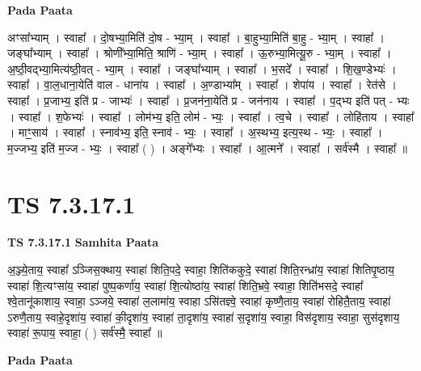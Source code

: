 \documentclass[17pt]{extarticle}
\begin{document}
\textbf{Pada Paata} \newline

अꣳसा᳚भ्याम् । स्वाहा᳚ । दो॒षभ्या॒मिति॑ दो॒ष - भ्या॒म् । स्वाहा᳚ । बा॒हुभ्या॒मिति॑ बा॒हु - भ्या॒म् । स्वाहा᳚ । जङ्घा᳚भ्याम् । स्वाहा᳚ । श्रोणी᳚भ्या॒मिति॒ श्राणि॑ - भ्या॒म् । स्वाहा᳚ । ऊ॒रुभ्या॒मित्यू॒रु - भ्या॒म् । स्वाहा᳚ । अ॒ष्ठी॒वद्भ्या॒मित्य॑ष्ठी॒वत् - भ्या॒म् । स्वाहा᳚ । जङ्घा᳚भ्याम् । स्वाहा᳚ । भ॒सदे᳚ । स्वाहा᳚ । शि॒ख॒ण्डेभ्यः॑ । स्वाहा᳚ । वा॒ल॒धाना॒येति॑ वाल - धाना॑य । स्वाहा᳚ । अ॒ण्डाभ्या᳚म् । स्वाहा᳚ । शेपा॑य । स्वाहा᳚ । रेत॑से । स्वाहा᳚ । प्र॒जाभ्य॒ इति॑ प्र - जाभ्यः॑ । स्वाहा᳚ । प्र॒जन॑ना॒येति॑ प्र - जन॑नाय । स्वाहा᳚ । प॒द्भ्य इति॑ पत् - भ्यः । स्वाहा᳚ । श॒फेभ्यः॑ । स्वाहा᳚ । लोम॑भ्य॒ इति॒ लोम॑ - भ्यः॒ । स्वाहा᳚ । त्व॒चे । स्वाहा᳚ । लोहि॑ताय । स्वाहा᳚ । माꣳ॒॒साय॑ । स्वाहा᳚ । स्नाव॑भ्य॒ इति॒ स्नाव॑ - भ्यः॒ । स्वाहा᳚ । अ॒स्थभ्य॒ इत्य॒स्थ - भ्यः॒ । स्वाहा᳚ । म॒ज्जभ्य॒ इति॑ म॒ज्ज - भ्यः॒ । स्वाहा᳚ ( ) । अङ्गे᳚भ्यः । स्वाहा᳚ । आ॒त्मने᳚ । स्वाहा᳚ । सर्व॑स्मै । स्वाहा᳚ ॥  \newline




\section*{ TS 7.3.17.1 }

\textbf{TS 7.3.17.1 } \newline
\textbf{Samhita Paata} \newline

अ॒ञ्ज्ये॒ताय॒ स्वाहा᳚ ऽञ्जिस॒क्थाय॒ स्वाहा॑ शिति॒पदे॒ स्वाहा॒ शिति॑ककुदे॒ स्वाहा॑ शिति॒रन्ध्रा॑य॒ स्वाहा॑ शितिपृ॒ष्ठाय॒ स्वाहा॑ शि॒त्यꣳसा॑य॒ स्वाहा॑ पुष्प॒कर्णा॑य॒ स्वाहा॑ शि॒त्योष्ठा॑य॒ स्वाहा॑ शिति॒भ्रवे॒ स्वाहा॒ शिति॑भसदे॒ स्वाहा᳚ श्वे॒तानू॑काशाय॒ स्वाहा॒ ऽञ्जये॒ स्वाहा॑ ल॒लामा॑य॒ स्वाहा ऽसि॑तज्ञ्वे॒ स्वाहा॑ कृष्णै॒ताय॒ स्वाहा॑ रोहितै॒ताय॒ स्वाहा॑ ऽरुणै॒ताय॒ स्वाहे॒दृशा॑य॒ स्वाहा॑ की॒दृशा॑य॒ स्वाहा॑ ता॒दृशा॑य॒ स्वाहा॑ स॒दृशा॑य॒ स्वाहा॒ विस॑दृशाय॒ स्वाहा॒ सुस॑दृशाय॒ स्वाहा॑ रू॒पाय॒ स्वाहा॒ ( ) सर्व॑स्मै॒ स्वाहा᳚ ॥ \newline

\textbf{Pada Paata} \newline
\end{document}
